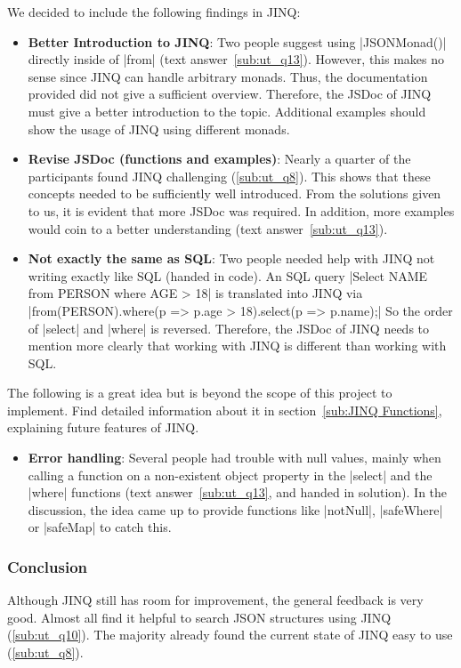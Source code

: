 We decided to include the following findings in JINQ:
\begin{itemize}
  \item \textbf{Better Introduction to JINQ}: Two people suggest using
    |JSONMonad()| directly inside of |from| (text answer~\ref{sub:ut_q13}).
    However, this makes no sense since JINQ can handle arbitrary monads. Thus,
    the documentation provided did not give a sufficient overview.
    Therefore, the JSDoc of JINQ must give a better introduction to the topic.
    Additional examples should show the usage of JINQ using different monads.
  \item \textbf{Revise JSDoc (functions and examples)}: Nearly a quarter of the participants found JINQ
    challenging (\ref{sub:ut_q8}). This shows that these concepts needed to be
    sufficiently well introduced. From the solutions given to us, it is evident
    that more JSDoc was required. In addition, more examples would coin to a
    better understanding (text answer~\ref{sub:ut_q13}).
    \item \textbf{Not exactly the same as SQL}: Two people needed help with
      JINQ not writing exactly like SQL (handed in code). An SQL query
      |Select NAME from PERSON where AGE > 18| is translated into JINQ via
      |from(PERSON).where(p => p.age > 18).select(p => p.name);| So the order
      of |select| and |where| is reversed. Therefore, the JSDoc of JINQ needs to
      mention more clearly that working with JINQ is different than working
      with SQL.
\end{itemize}

The following is a great idea but is beyond the scope of this project to
implement. Find detailed information about it in section~\ref{sub:JINQ
Functions}, explaining future features of JINQ.
\begin{itemize}
  \item \textbf{Error handling}: Several people had trouble with null values,
    mainly when calling a function on a non-existent object
    property in the |select| and the |where| functions (text
    answer~\ref{sub:ut_q13}, and handed in solution). In the discussion, the
    idea came up to provide functions like |notNull|, |safeWhere| or |safeMap|
    to catch this.
\end{itemize}

\subsubsection{Conclusion} %
\label{subsub:usertest_jinq_Conclusion}
Although JINQ still has room for improvement, the general feedback is very
good. Almost all find it helpful to search JSON structures using JINQ
(\ref{sub:ut_q10}). The majority already found the current state of JINQ easy
to use (\ref{sub:ut_q8}).

